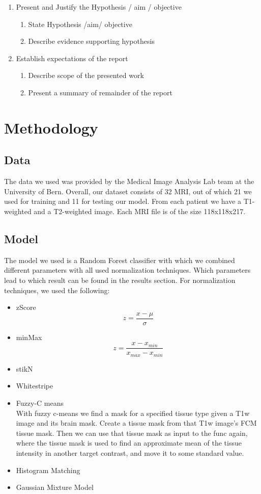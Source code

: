 \documentclass[conference]{IEEEtran}
\begin{document}
{\begin{enumerate}
\begin{enumerate}
	\end{enumerate}
\item Present and Justify the Hypothesis / aim / objective
	\begin{enumerate}
	\item State Hypothesis /aim/ objective
	\item Describe evidence supporting hypothesis
	\end{enumerate}
\item Establish expectations of the report
	\begin{enumerate}
	\item Describe scope of the presented work
	\item Present a summary of remainder of the report
	\end{enumerate}
\end{enumerate} 
}


\section{Methodology}
\subsection{Data}
	The data we used was provided by the Medical Image Analysis Lab team at the University of Bern. Overall, our dataset consists of 32 MRI,
	out of which 21 we used for training and 11 for testing our model. From each patient we have a T1-weighted and a T2-weighted image. Each MRI file
	is of the size 118x118x217.
\subsection{Model}
	The model we used is a Random Forest classifier with which we combined different parameters with all used normalization techniques. Which parameters
	lead to which result can be found in the results section. For normalization techniques, we used the following:
	\begin{itemize}
		\item zScore
		\begin{equation}
			z = \frac{x - \mu}{\sigma}
		\end{equation}
		\item minMax
		\begin{equation}
			z = \frac{x - x_{min}}{x_{max} - x_{min}}
		\end{equation}
		\item stikN
		\item Whitestripe
		\item Fuzzy-C means\\
		With fuzzy c-means we find a mask for a specified tissue type given a T1w image and its brain mask. Create a tissue mask
		from that T1w image's FCM tissue mask. Then we can use that tissue mask as input to the func again, where the tissue mask is
		used to find an approximate mean of the tissue intensity in	another target contrast, and move it to some standard value.
		\item Histogram Matching
		\item Gaussian Mixture Model
	\end{itemize}
\end{document}
